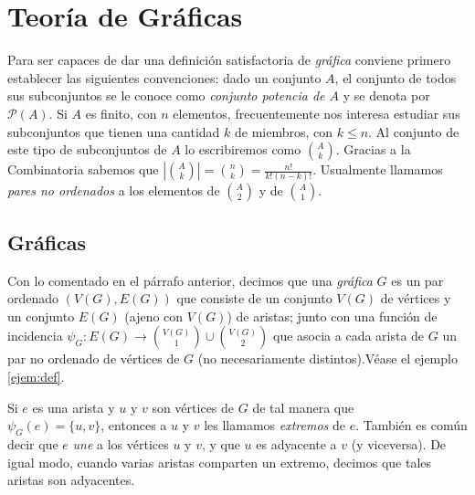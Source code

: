     \section{Teoría de Gráficas}

        Para ser capaces de dar una definición satisfactoria de \textit{gráfica} conviene primero establecer las siguientes convenciones:  dado un conjunto $A$, el conjunto de todos sus subconjuntos se le conoce como \textit{conjunto potencia de $A$} y se denota por $\mathcal{P}(A)$. Si $A$ es finito, con $n$ elementos, frecuentemente nos interesa estudiar sus subconjuntos que tienen una cantidad $k$ de miembros, con $k \leq n$. Al conjunto de este tipo de subconjuntos de $A$ lo escribiremos como $\binom{A}{k}$. Gracias a la Combinatoria sabemos que $\left | \binom{A}{k} \right | = \binom{n}{k} = \frac{n!}{k! (n -k)!}$. Usualmente llamamos \textit{pares no ordenados} a los elementos de $\binom{A}{2}$ y de $\binom{A}{1}$.

        \subsection{Gráficas} \label{sec:queesunagrafica}

            Con lo comentado en el párrafo anterior, decimos que una \textit{gráfica}  $G$ es un par ordenado $(V(G), E(G))$ que consiste de un conjunto $V(G)$ de \textnormal{vértices}  y un conjunto $E(G)$ (ajeno con $V(G)$) de \textnormal{aristas}; junto con una \textnormal{función de incidencia} $\psi_{G} \colon E(G) \rightarrow \binom{V(G)}{1} \cup \binom{V(G)}{2}$ que asocia a cada arista de $G$ un par no ordenado de vértices de $G$ (no necesariamente distintos).Véase el ejemplo \ref{ejem:def}.

            Si $e$ es una arista y $u$ y $v$ son vértices de $G$ de tal manera que \\ $\psi_{G}(e)=\{u,v\}$, entonces a $u$ y $v$ les llamamos \textit{extremos}  de $e$. También es común decir que $e$ \textit{une} a los vértices $u$ y $v$, y que $u$ es adyacente a $v$ (y viceversa). De igual modo, cuando varias aristas comparten un extremo, decimos que tales aristas son adyacentes.
 
